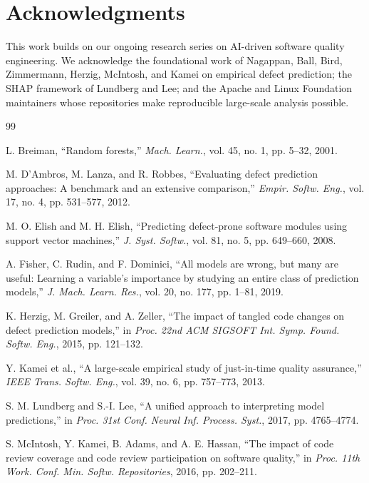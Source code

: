 \documentclass[conference]{IEEEtran}
\begin{document}
\section*{Acknowledgments}

This work builds on our ongoing research series on AI-driven software quality engineering. We acknowledge the foundational work of Nagappan, Ball, Bird, Zimmermann, Herzig, McIntosh, and Kamei on empirical defect prediction; the SHAP framework of Lundberg and Lee; and the Apache and Linux Foundation maintainers whose repositories make reproducible large-scale analysis possible.

\begin{thebibliography}{99}

 L. Breiman, ``Random forests,'' \textit{Mach. Learn.}, vol. 45, no. 1, pp. 5--32, 2001.

 M. D'Ambros, M. Lanza, and R. Robbes, ``Evaluating defect prediction approaches: A benchmark and an extensive comparison,'' \textit{Empir. Softw. Eng.}, vol. 17, no. 4, pp. 531--577, 2012.

 M. O. Elish and M. H. Elish, ``Predicting defect-prone software modules using support vector machines,'' \textit{J. Syst. Softw.}, vol. 81, no. 5, pp. 649--660, 2008.

 A. Fisher, C. Rudin, and F. Dominici, ``All models are wrong, but many are useful: Learning a variable's importance by studying an entire class of prediction models,'' \textit{J. Mach. Learn. Res.}, vol. 20, no. 177, pp. 1--81, 2019.

 K. Herzig, M. Greiler, and A. Zeller, ``The impact of tangled code changes on defect prediction models,'' in \textit{Proc. 22nd ACM SIGSOFT Int. Symp. Found. Softw. Eng.}, 2015, pp. 121--132.

 Y. Kamei et al., ``A large-scale empirical study of just-in-time quality assurance,'' \textit{IEEE Trans. Softw. Eng.}, vol. 39, no. 6, pp. 757--773, 2013.

 S. M. Lundberg and S.-I. Lee, ``A unified approach to interpreting model predictions,'' in \textit{Proc. 31st Conf. Neural Inf. Process. Syst.}, 2017, pp. 4765--4774.

 S. McIntosh, Y. Kamei, B. Adams, and A. E. Hassan, ``The impact of code review coverage and code review participation on software quality,'' in \textit{Proc. 11th Work. Conf. Min. Softw. Repositories}, 2016, pp. 202--211.


\end{thebibliography}
\end{document}
